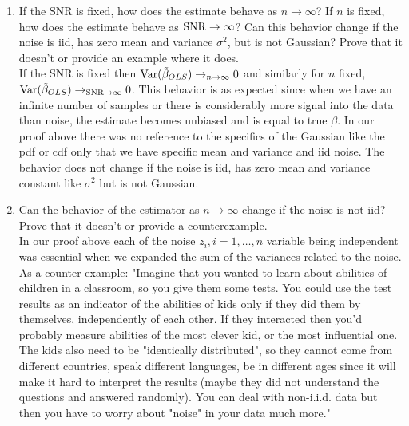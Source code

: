 \documentclass[12pt,twoside]{article}
\begin{document}
\begin{enumerate}
\begin{enumerate}
  \item If the SNR is fixed, how does the estimate behave as $n \rightarrow \infty$? If $n$ is fixed, how does the estimate behave as $\operatorname{SNR} \rightarrow \infty$? Can this behavior change if the noise is iid, has zero mean and variance $\sigma^2$, but is not Gaussian? Prove that it doesn't or provide an example where it does.\\
  
  \medskip
If the SNR is fixed then $\mathrm{Var}{(\tilde{ \beta }_{OLS})} \rightarrow_{n \rightarrow \infty} 0$ and similarly for $n$ fixed, $\mathrm{Var}{(\tilde{ \beta }_{OLS})} \rightarrow_{\operatorname{SNR}\rightarrow \infty} 0$. This behavior is as expected since when we have an infinite number of samples or there is considerably more signal into the data than noise, the estimate becomes unbiased and is equal to true $\beta$. 
	In our proof above there was no reference to the specifics of the Gaussian like the pdf or cdf only that we have specific mean and variance and iid noise.
	The behavior does not change if the noise is iid, has zero mean and variance constant like $\sigma^2$ but is not Gaussian.
  \medskip

  \item Can the behavior of the estimator as $n \rightarrow \infty$ change if the noise is not iid? Prove that it doesn't or provide a counterexample.\\
  
  \medskip
  In our proof above each of the noise $z_i, i=1, \ldots, n$ variable being independent was essential when we expanded the sum of the variances related to the noise.
   As a counter-example:
  "Imagine that you wanted to learn about abilities of children in a classroom, so you give them some tests. 
  You could use the test results as an indicator of the abilities of kids only if they did them by themselves, independently of each other. 
  If they interacted then you'd probably measure abilities of the most clever kid, or the most influential one.
  The kids also need to be "identically distributed", so they cannot come from different countries, speak different languages, be in different ages since it will make it hard to interpret the results
   (maybe they did not understand the questions and answered randomly). You can deal with non-i.i.d. data but then you have to worry about "noise" in your data much more."

  
  
  \end{enumerate} 
   
 \newpage
 

\end{enumerate}
\end{document}
